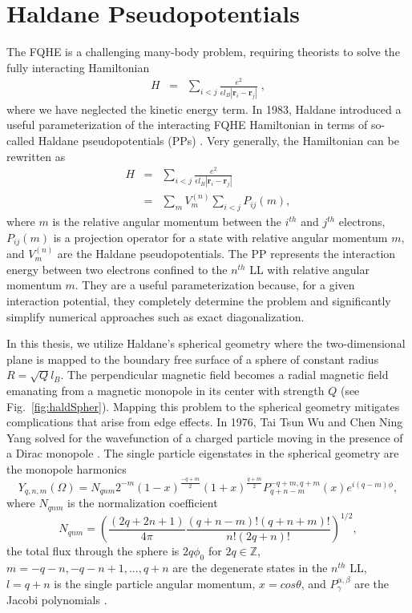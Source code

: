     \section{Haldane Pseudopotentials}\label{sec:haldPseud}
    The FQHE is a challenging many-body problem, requiring theorists to solve the fully interacting Hamiltonian 
    \begin{eqnarray}
        H &=& \sum_{i<j} \frac{e^2}{\epsilon l_B |\mathbf{r}_i-\mathbf{r}_j|}\;,
    \end{eqnarray}
    where we have neglected the kinetic energy term. In 1983, Haldane introduced a useful parameterization of the interacting FQHE Hamiltonian in terms of so-called Haldane pseudopotentials (PPs) \cite{haldane}. Very generally, the Hamiltonian can be rewritten as
    \begin{eqnarray}\label{HamPPexpand}
        H &=& \sum_{i<j} \frac{e^2}{\epsilon l_B |\mathbf{r}_i-\mathbf{r}_j|}\nonumber\\
        &=& \sum_m V^{(n)}_m \sum_{i<j} P_{ij}(m),
    \end{eqnarray}
    where $m$ is the relative angular momentum between the $i^{th}$ and $j^{th}$ electrons, $P_{ij}(m)$ is a projection operator for a state with relative angular momentum $m$, and $V^{(n)}_m$ are the Haldane pseudopotentials. The PP represents the interaction energy between two electrons confined to the $n^{th}$ LL with relative angular momentum $m$. They are a useful parameterization because, for a given interaction potential, they completely determine the problem and significantly simplify numerical approaches such as exact diagonalization.
    
    In this thesis, we utilize Haldane's spherical geometry where the two-dimensional plane is mapped to the boundary free surface of a sphere of constant radius $R=\sqrt{Q}l_B$. The perpendicular magnetic field becomes a radial magnetic field emanating from a magnetic monopole in its center with strength $Q$ (see Fig.~\ref{fig:haldSpher}). Mapping this problem to the spherical geometry mitigates complications that arise from edge effects. In 1976, Tai Tsun Wu and Chen Ning Yang solved for the wavefunction of a charged particle moving in the presence of a Dirac monopole \cite{wu}. The single particle eigenstates in the spherical geometry are the monopole harmonics
	\begin{equation} \label{monHarm}
    Y_{q,n,m}(\Omega)=N_{qnm}2^{-m}(1-x)^{\frac{-q+m}{2}}(1+x)^{\frac{q+m}{2}}P_{q+n-m}^{-q+m,q+m}(x)e^{i(q-m)\phi},
    \end{equation}
    where $N_{qnm}$ is the normalization coefficient
    \begin{equation} \label{monHarmNormCo}
    N_{qnm}=\left(\frac{(2q+2n+1)}{4\pi}\frac{(q+n-m)!(q+n+m)!}{n!(2q+n)!}\right)^{1/2},
    \end{equation}
    the total flux through the sphere is $2q\phi_0$ for $2q\in\mathbb{Z}$, $m=-q-n,-q-n+1,...,q+n$ are the degenerate states in the $n^{th}$ LL, $l=q+n$ is the single particle angular momentum, $x=cos\theta$, and $P^{\alpha,\beta}_\gamma$ are the Jacobi polynomials \cite{bible}. 
    
